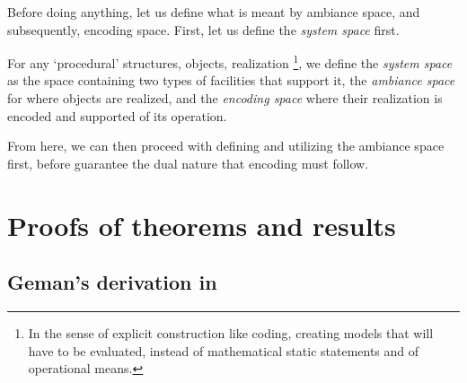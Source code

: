 \documentclass[10pt]{article}
\begin{document}
Before doing anything, let us define what is meant by ambiance space, and subsequently, encoding space. First, let us define the \textit{system space} first. 
\begin{definition}
  For any `procedural' structures, objects, realization \footnote{In the sense of explicit construction like coding, creating models that will have to be evaluated, instead of mathematical static statements and of operational means.}, we define the \textit{system space} as the space containing two types of facilities that support it, the \textit{ambiance space} for where objects are realized, and the \textit{encoding space} where their realization is encoded and supported of its operation. 
\end{definition}

From here, we can then proceed with defining and utilizing the ambiance space first, before guarantee the dual nature that encoding must follow. 

\clearpage

  

\clearpage

\appendix

\section{Proofs of theorems and results}

\subsection{Geman's derivation in \cite{6797087}}
\end{document}
